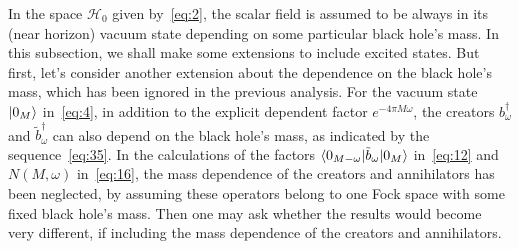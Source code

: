 \documentclass[12pt,a4paper]{article}
\begin{document}
In the space $\mathcal {H}_0$ given by~\eqref{eq:2}, the scalar field is assumed to be always in its (near horizon) vacuum state depending on some particular black hole's mass. In this subsection, we shall make some extensions to include excited states. But first, let's consider another extension about the dependence on the black hole's mass, which has been ignored in the previous analysis. For the vacuum state $\arrowvert0_M\rangle$ in~\eqref{eq:4}, in addition to the explicit
dependent factor $e^{-4\pi M\omega}$, the creators $b_{\omega}^{\dag}$ and
$\tilde{b}_{\omega}^{\dag}$ can also depend on the black hole's mass,
as indicated by the sequence~\eqref{eq:35}. In the calculations of the factors
$\langle0_{M-\omega}\arrowvert\tilde{b}_{\omega}\arrowvert0_M\rangle$
in~\eqref{eq:12} and $N(M,\omega)$ in~\eqref{eq:16}, the mass dependence of the creators and annihilators has been neglected, by assuming these operators belong to one Fock space with some fixed black hole's mass. Then one may ask whether the results would become very different, if including the mass dependence of the creators and annihilators.
\end{document}
